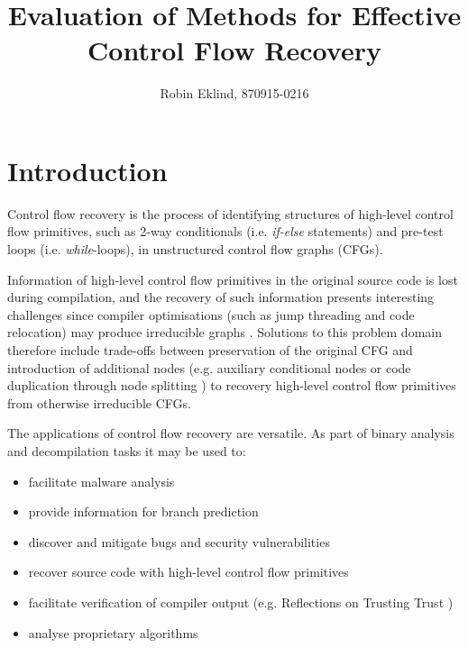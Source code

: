 \documentclass[12pt, a4paper]{article}
\title{Evaluation of Methods for Effective Control Flow Recovery}
\author{Robin Eklind, 870915-0216}
\begin{document}
\maketitle

\clearpage

\tableofcontents

\clearpage


\section{Introduction}

Control flow recovery is the process of identifying structures of high-level control flow primitives, such as 2-way conditionals (i.e. \textit{if-else} statements) and pre-test loops (i.e. \textit{while}-loops), in unstructured control flow graphs (CFGs).

Information of high-level control flow primitives in the original source code is lost during compilation, and the recovery of such information presents interesting challenges since compiler optimisations (such as jump threading and code relocation) may produce irreducible graphs \cite{cifuentes_reverse_comp}. Solutions to this problem domain therefore include trade-offs between preservation of the original CFG and introduction of additional nodes (e.g. auxiliary conditional nodes \cite{no_more_gotos} or code duplication through node splitting \cite{node_splitting}) to recovery high-level control flow primitives from otherwise irreducible CFGs.

The applications of control flow recovery are versatile. As part of binary analysis and decompilation tasks it may be used to:

\begin{itemize}
	\item facilitate malware analysis
	\item provide information for branch prediction
	\item discover and mitigate bugs and security vulnerabilities
	\item recover source code with high-level control flow primitives
	\item facilitate verification of compiler output (e.g. Reflections on Trusting Trust \cite{trusting_trust})
	\item analyse proprietary algorithms
\end{itemize}
\end{document}
